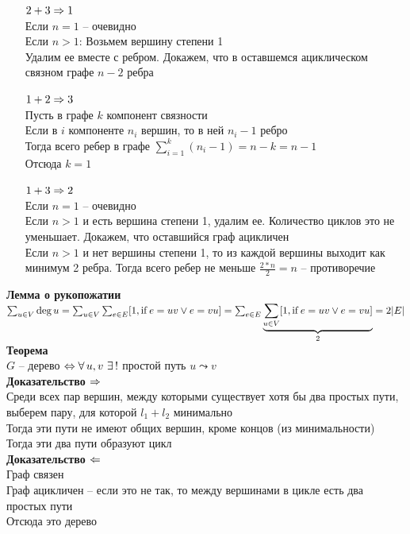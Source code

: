 \documentclass[12pt]{article}
\begin{document}
\begin{itemize}
    \item[$2 + 3 \Rto 1$] $ $\\
    Если $n = 1$ -- очевидно\\
    Если $n > 1$: Возьмем вершину степени 1\\
    Удалим ее вместе с ребром. Докажем, что в оставшемся ациклическом связном графе $n-2$ ребра
    \item[$1 + 2 \Rto 3$] $ $\\
    Пусть в графе $k$ компонент связности\\
    Если в $i$ компоненте $n_i$ вершин, то в ней $n_i - 1$ ребро\\
    Тогда всего ребер в графе $\sum_{i=1}^k (n_i - 1) = n - k = n - 1$\\
    Отсюда $k=1$
    \item[$1 + 3 \Rto 2$] $ $\\
    Если $n = 1$ -- очевидно\\
    Если $n > 1$ и есть вершина степени 1, удалим ее. Количество циклов это не уменьшает. Докажем, что оставшийся граф ацикличен\\
    Если $n > 1$ и нет вершины степени 1, то из каждой вершины выходит как минимум 2 ребра. Тогда всего ребер не меньше $\frac{2 * n}2 = n$ -- противоречие
\end{itemize}
\textbf{Лемма о рукопожатии}\\
$\sum_{u \in V} \deg u = \sum_{u \in V} \sum_{e \in E} [1, \nm{if} e = uv \lor e = vu] = \sum_{e \in E} \ub{2}{\sum_{u \in V} [1, \nm{if} e = uv \lor e = vu]} = 2|E|$\\
\textbf{Теорема}\\
$G$ -- дерево $\LRto \fall u,v\ \ex!$ простой путь $u \leadsto v$\\
\textbf{Доказательство $\Rto$}\\
Среди всех пар вершин, между которыми существует хотя бы два простых пути, выберем пару, для которой $l_1+l_2$ минимально\\
Тогда эти пути не имеют общих вершин, кроме концов (из минимальности)\\
Тогда эти два пути образуют цикл\\
\textbf{Доказательство $\Lto$}\\
Граф связен\\
Граф ацикличен -- если это не так, то между вершинами в цикле есть два простых пути\\
Отсюда это дерево\\
\end{document}
